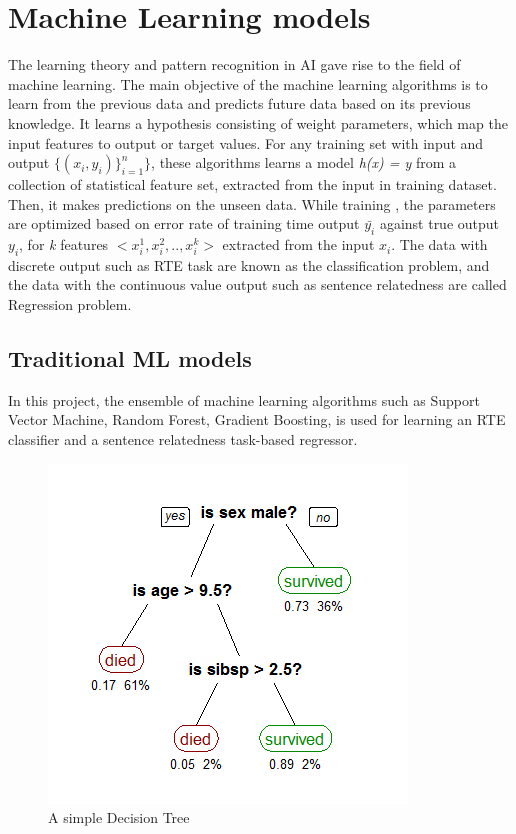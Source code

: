 \documentclass[12pt]{report} %
\begin{document}
\section{Machine Learning models}

The learning theory and pattern recognition in AI gave rise to the field of machine learning. The main objective of the machine learning algorithms is to learn from the previous data and predicts future data based on its previous knowledge. It learns a hypothesis consisting of weight parameters, which map the input features to output or target values. For any training set with input and output $\{(x_{i},y_{i})\}_{i=1}^{n}\}$, these algorithms learns a model \textit{h(x) = y} from a collection of statistical feature set, extracted from the input in training dataset. Then, it makes predictions on the unseen data.  While training , the parameters are optimized based on error rate of training time output $\bar{y_{i}}$ against true output $y_{i}$, for \textit{k} features $<x^{1}_{i},x^{2}_{i},..,x^{k}_{i}>$ extracted from the input $x_{i}$. The data with discrete output such as RTE task are known as the classification problem, and  the data with the continuous value output such as sentence relatedness are called Regression problem. 

\subsection{Traditional ML models}

In this project, the ensemble of machine learning algorithms such as Support Vector Machine, Random Forest, Gradient Boosting, is used for learning an RTE classifier and a sentence relatedness task-based regressor. 

\begin{figure}[!tbp]
	\centering
	\caption{A simple Decision Tree}
	\label{tree}
	\includegraphics[scale=0.50]{image/tree.png}
\end{figure}
\end{document}
